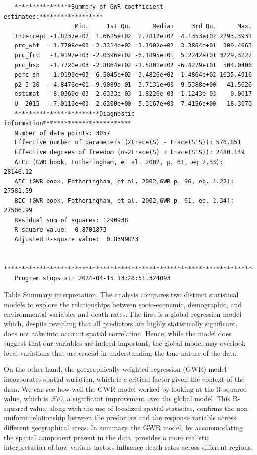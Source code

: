 \documentclass[
]{article}
\begin{document}
\begin{verbatim}
   ****************Summary of GWR coefficient estimates:******************
                    Min.     1st Qu.      Median     3rd Qu.      Max.
   Intercept -1.8237e+02  1.6625e+02  2.7812e+02  4.1353e+02 2293.3931
   prc_wht   -1.7708e+03 -2.3314e+02 -1.1902e+02 -3.3864e+01  309.4663
   prc_frc   -1.9197e+03 -2.0396e+02 -6.1895e+01  5.2242e+01 3229.3222
   prc_hsp   -1.7720e+03 -2.8864e+02 -1.5801e+02 -6.4279e+01  504.0406
   perc_sn   -1.9199e+03 -6.5045e+02 -3.4826e+02 -1.4864e+02 1635.4916
   p2_5_20   -4.8476e+01 -9.9089e-01  3.7131e+00  9.5388e+00   41.5626
   estimat   -8.0369e-03 -2.6333e-03 -1.8226e-03 -1.1243e-03    0.0017
   U__2015   -7.0110e+00  2.6200e+00  5.3167e+00  7.4156e+00   18.3070
   ************************Diagnostic information*************************
   Number of data points: 3057 
   Effective number of parameters (2trace(S) - trace(S'S)): 576.851 
   Effective degrees of freedom (n-2trace(S) + trace(S'S)): 2480.149 
   AICc (GWR book, Fotheringham, et al. 2002, p. 61, eq 2.33): 28146.12 
   AIC (GWR book, Fotheringham, et al. 2002,GWR p. 96, eq. 4.22): 27581.59 
   BIC (GWR book, Fotheringham, et al. 2002,GWR p. 61, eq. 2.34): 27506.99 
   Residual sum of squares: 1290938 
   R-square value:  0.8701873 
   Adjusted R-square value:  0.8399823 

   ***********************************************************************
   Program stops at: 2024-04-15 13:28:51.324093 
\end{verbatim}

Table Summary interpretation: The analysis compares two distinct
statistical models to explore the relationships between socio-economic,
demographic, and environmental variables and death rates. The first is a
global regression model which, despite revealing that all predictors are
highly statistically significant, does not take into account spatial
correlation. Hence, while the model does suggest that our variables are
indeed important, the global model may overlook local variations that
are crucial in understanding the true nature of the data.~

On the other hand, the geographically weighted regression (GWR) model
incorporates spatial variation, which is a critical factor given the
context of the data. We can see how well the GWR model worked by looking
at the R-squared value, which is .870, a significant improvement over
the global model. This R-squared value, along with the use of localized
spatial statistics, confirms the non-uniform relationship between the
predictors and the response variable across different geographical
areas. In summary, the GWR model, by accommodating the spatial component
present in the data, provides a more realistic interpretation of how
various factors influence death rates across different regions.
\end{document}
